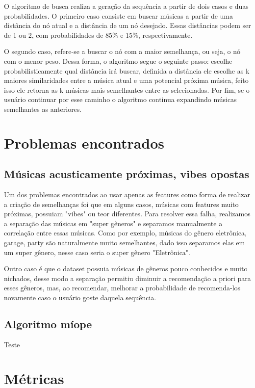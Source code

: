 \documentclass[conference]{IEEEtran}
\begin{document}
O algoritmo de busca realiza a geração da sequência a partir de dois casos e duas probabilidades. O primeiro caso consiste em buscar músicas a partir de uma distância do nó
atual e a distância de um nó desejado. Essas distâncias podem ser de 1 ou 2, com probabilidades de $85\%$ e $15\%$, respectivamente. 

O segundo caso, refere-se a buscar o nó com a maior semelhança, ou seja, o nó com o menor peso. Dessa forma, o algoritmo segue o seguinte passo: escolhe probabilisticamente qual distância irá buscar, definida a distância ele escolhe as k maiores similaridades entre a
música atual e uma potencial próxima música, feito isso ele retorna as k-músicas mais 
semelhantes entre as selecionadas. Por fim, se o usuário continuar por esse caminho o
algoritmo continua expandindo músicas semelhantes as anteriores.


\section{Problemas encontrados}

\subsection*{Músicas acusticamente próximas, vibes opostas}

Um dos problemas encontrados ao usar apenas as features como forma de realizar a criação
de semelhanças foi que em alguns casos, músicas com features muito próximas, possuiam
"vibes" ou teor diferentes. Para resolver essa falha, realizamos a separação das músicas
em "super gêneros" e separamos manualmente a correlação entre essas músicas. Como por exemplo, músicas do gênero eletrônica, garage, party são naturalmente muito semelhantes,
dado isso separamos elas em um super gênero, nesse caso seria o super gênero "Eletrônica".

Outro caso é que o dataset possuia músicas de gêneros pouco conhecidos e muito nichados, desse modo a separação permitiu diminuir a recomendação a priori para esses gêneros, mas, ao recomendar, melhorar a probabilidade de recomenda-los novamente caso o usuário goste daquela sequência.


\subsection{Algoritmo míope}

Teste

\section{Métricas}
\end{document}
